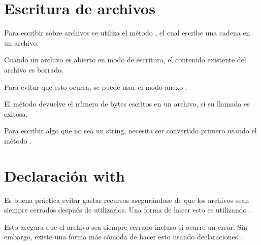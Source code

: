 
\section{Escritura de archivos}

Para escribir sobre archivos se utiliza el método , el cual escribe una cadena en un archivo.


Cuando un archivo es abierto en modo de escritura, el contenido existente del archivo es borrado.


Para evitar que esto ocurra, se puede usar el modo anexo .


El método  devuelve el número de bytes escritos en un archivo, si su llamada es exitosa.


Para escribir algo que no sea un string, necesita ser convertido primero usando el método .


\section{Declaración with}

Es buena práctica evitar gastar recursos asegurándose de que los archivos sean siempre cerrados después de utilizarlos.
Una forma de hacer esto es utilizando .


Esto asegura que el archivo sea siempre cerrado incluso si ocurre un error.
Sin embargo, existe una forma más cómoda de hacer esto usando declaraciones .

